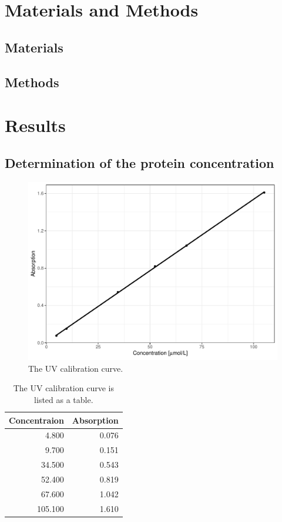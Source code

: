 \documentclass[12pt]{article}
\begin{document}
\section{Materials and Methods}
\subsection{Materials}


\subsection{Methods}


\section{Results}

\subsection{Determination of the protein concentration}

\begin{figure}[H]
    \centering
    \includegraphics[scale=.5]{UVcurve.pdf}
    \caption{The UV calibration curve.}
    \label{biorad}
\end{figure}

\begin{table}[H]
\centering
\caption{The UV calibration curve is listed as a table.} 
\begin{tabular}{r|r}
  \toprule
Concentraion & Absorption \\ 
  \midrule
4.800 & 0.076 \\ 
  9.700 & 0.151 \\ 
  34.500 & 0.543 \\ 
  52.400 & 0.819 \\ 
  67.600 & 1.042 \\ 
  105.100 & 1.610 \\ 
   \bottomrule
\end{tabular}
\end{table}
\end{document}
